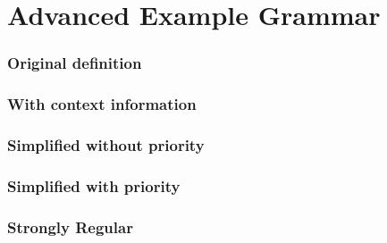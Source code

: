 
\chapter{Advanced Example Grammar} %

\label{app:advancedGrammar} %

\subsection{Original definition} \label{app:advancedGrammar:default}


\subsection{With context information} \label{app:advancedGrammar:contexts}
 

\subsection{Simplified without priority} \label{app:advancedGrammar:simple}


\subsection{Simplified with priority} \label{app:advancedGrammar:simplePriority}


\subsection{Strongly Regular} \label{app:advancedGrammar:stronglyregular}


